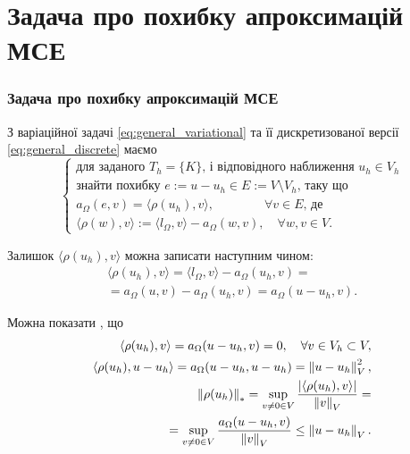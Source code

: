 

\section{Задача про похибку апроксимацій МСЕ}
\frame{\sectionpage}
\begin{frame}[allowframebreaks]
	\frametitle<presentation>{Задача про похибку апроксимацій МСЕ}

		З варіаційної задачі \eqref{eq:general_variational} та її дискретизованої версії
		\eqref{eq:general_discrete} маємо
		\begin{equation}\label{eq:AE_problem}
			\begin{cases}
				\mbox{для заданого } T_h=\{K\} \text{, і відповідного наближення } u_h \in V_h \\
				\text{знайти похибку } e:=u-u_h \in E := V \setminus V_h \text{, таку що} \\
				a_\Omega(e,v) = \langle\rho(u_h), v\rangle, \qquad \qquad \forall v \in E \text{, де}\\
				\langle\rho(w), v\rangle := \langle l_\Omega, v\rangle - a_\Omega(w, v), \quad \forall w,v \in V.
			\end{cases}
		\end{equation}

	\framebreak

		Залишок $\langle\rho(u_h), v\rangle$ можна записати наступним чином:
		\begin{equation*}
			\begin{split}
				\langle\rho(u_h), v\rangle
					= \langle l_\Omega, v\rangle - a_\Omega(u_h, v) = \\
					= a_\Omega(u,v)-a_\Omega(u_h, v) = a_\Omega(u-u_h, v).
			\end{split}
		\end{equation*}

		Можна показати , що
		\begin{equation*}\label{eq:residual_properties}
			\begin{split}
				\langle\rho(u_h), v\rangle = a_\Omega(u-u_h, v) = 0, \quad \forall v \in V_h \subset V,\\
				\langle\rho(u_h), u-u_h\rangle = a_\Omega(u-u_h, u-u_h) = \left\lVert u-u_h\right\rVert^2_V,\\
				\left\lVert\rho(u_h)\right\rVert_* = \sup \limits_{v \ne 0 \in V} \frac{|\langle\rho(u_h), v\rangle|}{\left\lVert v\right\rVert_V} = \\
					 = \sup \limits_{v \ne 0 \in V} \frac{a_\Omega(u-u_h, v)}{\left\lVert v\right\rVert_V} \le \left\lVert u-u_h\right\rVert_V .
			\end{split}
		\end{equation*}
\end{frame}
